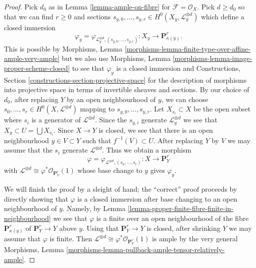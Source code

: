 \begin{proof}
Pick $d_0$ as in Lemma \ref{lemma-ample-on-fibre} for
$\mathcal{F} = \mathcal{O}_X$. Pick $d \geq d_0$
so that we can find $r \geq 0$ and sections
$s_{y, 0}, \ldots, s_{y, r} \in H^0(X_y, \mathcal{L}_y^{\otimes d})$
which define a closed immersion
$$
\varphi_y =
\varphi_{\mathcal{L}_y^{\otimes d}, (s_{y, 0}, \ldots, s_{y, r})} :
X_y \to \mathbf{P}^r_{\kappa(y)}.
$$
This is possible by Morphisms, Lemma
\ref{morphisms-lemma-finite-type-over-affine-ample-very-ample}
but we also use
Morphisms, Lemma \ref{morphisms-lemma-image-proper-scheme-closed}
to see that $\varphi_y$ is a closed immersion and
Constructions, Section \ref{constructions-section-projective-space}
for the description of morphisms into projective
space in terms of invertible sheaves and sections.
By our choice of $d_0$, after replacing $Y$ by an open neighbourhood
of $y$, we can choose
$s_0, \ldots, s_r \in H^0(X, \mathcal{L}^{\otimes d})$
mapping to $s_{y, 0}, \ldots, s_{y, r}$.
Let $X_{s_i} \subset X$ be the open subset where $s_i$
is a generator of $\mathcal{L}^{\otimes d}$. Since
the $s_{y, i}$ generate $\mathcal{L}_y^{\otimes d}$ we see that
$X_y \subset U = \bigcup X_{s_i}$.
Since $X \to Y$ is closed, we see that
there is an open neighbourhood $y \in V \subset Y$
such that $f^{-1}(V) \subset U$.
After replacing $Y$ by $V$ we may assume that
the $s_i$ generate $\mathcal{L}^{\otimes d}$. Thus we
obtain a morphism
$$
\varphi = \varphi_{\mathcal{L}^{\otimes d}, (s_0, \ldots, s_r)} :
X \longrightarrow \mathbf{P}^r_Y
$$
with $\mathcal{L}^{\otimes d} \cong \varphi^*\mathcal{O}_{\mathbf{P}^r_Y}(1)$
whose base change to $y$ gives $\varphi_y$.

\medskip\noindent
We will finish the proof by a sleight of hand; the ``correct'' proof
proceeds by directly showing that $\varphi$ is a closed
immersion after base changing to an open neighbourhood of $y$.
Namely, by Lemma \ref{lemma-proper-finite-fibre-finite-in-neighbourhood}
we see that $\varphi$ is a finite over an open neighbourhood
of the fibre $\mathbf{P}^r_{\kappa(y)}$ of $\mathbf{P}^r_Y \to Y$
above $y$. Using that $\mathbf{P}^r_Y \to Y$ is closed, after
shrinking $Y$ we may assume that $\varphi$ is finite.
Then $\mathcal{L}^{\otimes d} \cong \varphi^*\mathcal{O}_{\mathbf{P}^r_Y}(1)$
is ample by the very general
Morphisms, Lemma \ref{morphisms-lemma-pullback-ample-tensor-relatively-ample}.
\end{proof}





